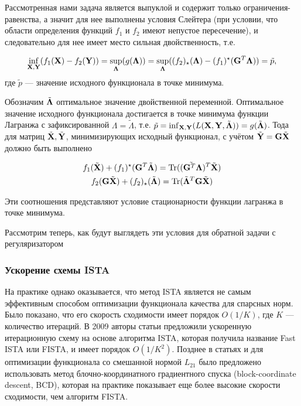 Рассмотренная нами задача является выпуклой и содержит только
ограничения-равенства, а значит для нее выполнены условия Слейтера (при
условии, что области определения функций $f_1$ и $f_2$ имеют непустое
пересечение), и следовательно для нее имеет место сильная двойственность,
т.е. 

\begin{equation}
    \inf_{\mathbf{X}, \mathbf{Y}}(f_1(\mathbf{X}) - f_2(\mathbf{Y})) = \sup_{\mathbf{\Lambda}}(g(\mathbf{\Lambda})) =
    \sup_{\mathbf{\Lambda}}((f_2)_{\star}(\mathbf{\Lambda}) - (f_1)^{\star}(\mathbf{G}^T\mathbf{\Lambda})) = \tilde{p},
\end{equation}
где $\tilde{p}$ --- значение исходного функционала в точке минимума.

Обозначим
$\tilde{\mathbf{\Lambda}}$ оптимальное значение двойственной переменной.
Оптимальное значение исходного функционала достигается в точке минимума
функции Лагранжа с зафиксированной $\Lambda = \tilde{\Lambda}$, т.е.
$ \tilde{p} = \inf_{\mathbf{X}, \mathbf{Y}}(L(\mathbf{X}, \mathbf{Y}, \tilde{\mathbf{\Lambda}})) =
g(\tilde{\mathbf{\Lambda}})$. Тода для матриц $\tilde{\mathbf{X}},
\tilde{\mathbf{Y}}$, минимизирующих исходный функционал, с учётом $\tilde{\mathbf{Y}} =
\mathbf{G}\tilde{\mathbf{X}}$ должно быть выполнено

\begin{gather}
    f_1(\tilde{\mathbf{X}}) + (f_1)^{\star}(\mathbf{G}^T\tilde{\mathbf{\Lambda}}) = \operatorname*{Tr}(\tilde{(\mathbf{G}^T\mathbf{\Lambda}})^T\tilde{\mathbf{X}})\\
    f_2(\mathbf{G}\tilde{\mathbf{X}}) + (f_2)_{\star}(\tilde{\mathbf{\Lambda}}) = \operatorname*{Tr}(\tilde{\mathbf{\Lambda}}^T\mathbf{G}\tilde{\mathbf{X}})
    \label{eq:dual_kkt_conditions}
\end{gather}

Эти соотношения представляют условие стационарности функции лагранжа в точке минимума.

Рассмотрим теперь, как будут выглядеть эти условия для обратной задачи с регуляризатором


\subsubsection{Ускорение схемы ISTA} 

На практике однако оказывается, что метод
ISTA является не самым эффективным способом оптимизации функционала качества
для спарсных норм. Было показано, что его скорость сходимости имеет порядок
$O(1/K)$, где $K$ --- количество итераций. В 2009 авторы статьи
\cite{beck_trebulle_2009} предложили ускоренную итерационную схему на основе
алгоритма ISTA, которая получила название Fast ISTA или FISTA, и имеет порядок
$O(1/K^2)$. Позднее в статьях \cite{rakotomamonjy_2011} и \cite{qin_2013} для
оптимизации функционала со смешанной нормой $L_{21}$ было предложено
использовать метод блочно-координатного градиентного спуска (block-coordinate
descent, BCD), которая на практике показывает еще более высокие скорости сходимости,
чем алгоритм FISTA.

